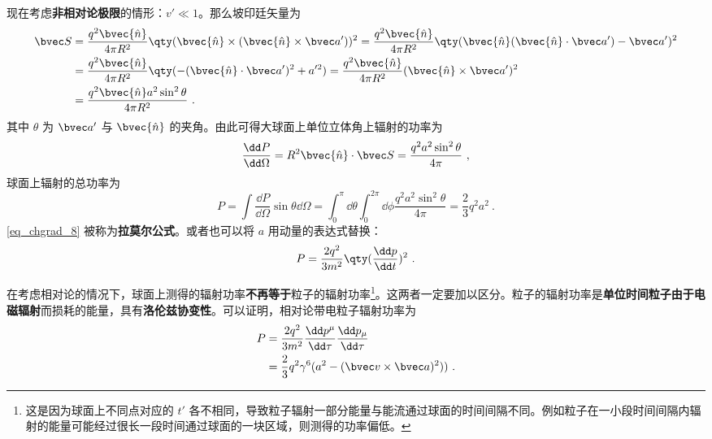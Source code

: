 现在考虑\textbf{非相对论极限}的情形：$v'\ll 1$。那么坡印廷矢量为
\begin{equation}
\begin{aligned}
\bvec S&=\frac{q^2\bvec{\hat n}}{4\pi R^2}\qty(\bvec{\hat n}\times (\bvec{\hat n}\times \bvec a'))^2=\frac{q^2\bvec{\hat n}}{4\pi R^2}\qty(\bvec {\hat n}(\bvec{\hat n}\cdot \bvec a')-\bvec a')^2\\
&=\frac{q^2\bvec{\hat n}}{4\pi R^2}\qty( -(\bvec{\hat n}\cdot \bvec a')^2+a'^2 )=\frac{q^2\bvec{\hat n}}{4\pi R^2}(\bvec{\hat n}\times \bvec a')^2\\
&=\frac{q^2\bvec{\hat n}a^2\sin^2\theta}{4\pi R^2}~.
\end{aligned}
\end{equation}
其中 $\theta$ 为 $\bvec a'$ 与 $\bvec{\hat n}$ 的夹角。由此可得大球面上单位立体角上辐射的功率为
\begin{equation}
\frac{\dd P}{\dd \Omega}=R^2\bvec{\hat n}\cdot \bvec S=\frac{q^2a^2\sin^2\theta}{4\pi}~,
\end{equation}
球面上辐射的总功率为
\begin{equation}\label{eq_chgrad_8}
P=\int \frac{\dd P}{\dd \Omega} \sin \theta\dd \Omega=\int_0^\pi\dd \theta\int_0^{2\pi} \dd \phi \frac{q^2a^2\sin^2\theta}{4\pi}=\frac{2}{3}q^2a^2~.
\end{equation}
\autoref{eq_chgrad_8} 被称为\textbf{拉莫尔公式}。或者也可以将 $a$ 用动量的表达式替换：
\begin{equation}
P=\frac{2q^2}{3m^2}\qty(\frac{\dd p}{\dd t})^2~.
\end{equation}

在考虑相对论的情况下，球面上测得的辐射功率\textbf{不再等于}粒子的辐射功率\footnote{这是因为球面上不同点对应的 $t'$ 各不相同，导致粒子辐射一部分能量与能流通过球面的时间间隔不同。例如粒子在一小段时间间隔内辐射的能量可能经过很长一段时间通过球面的一块区域，则测得的功率偏低。}。这两者一定要加以区分。粒子的辐射功率是\textbf{单位时间粒子由于电磁辐射}而损耗的能量，具有\textbf{洛伦兹协变性}。可以证明，相对论带电粒子辐射功率为
\begin{equation}
\begin{aligned}
P&=\frac{2q^2}{3m^2}\frac{\dd p^\mu}{\dd \tau}\frac{\dd p_\mu}{\dd \tau}\\
&=\frac{2}{3}q^2\gamma^6(a^2-(\bvec v\times \bvec a)^2))~.
\end{aligned}
\end{equation}
